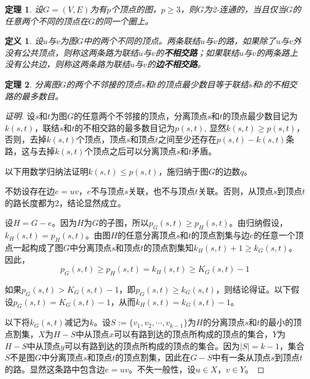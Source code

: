 \documentclass{article}
\newtheorem{Def}{定义}
\newtheorem{Thm}{定理}
\begin{document}
\begin{CJK*}{UTF8}{gbsn}
    \begin{Thm}
    设$G=(V,E)$为有$p$个顶点的图，$p \geq 3$，则$G$为2-连通的，当且仅当$G$的任意两个不同的顶点在$G$的同一个圈上。
  \end{Thm}
  \begin{Def}
    设$u$与$v$为图$G$中的两个不同的顶点。两条联结$u$与$v$的路，如果除了$u$与$v$外没有公共顶点，则称这两条路为联结$u$与$v$的{\bfseries 不相交路}；如果联结$u$与$v$的两条路上没有公共边，则称这两条路为联结$u$与$v$的{\bfseries 边不相交路}。
  \end{Def}
  \begin{Thm}
    分离图$G$的两个不邻接的顶点$s$和$t$的顶点最少数目等于联结$s$和$t$的不相交路的最多数目。
  \end{Thm}
  \begin{proof}[证明]\justifying\let\raggedright\justifying
    设$s$和$t$为图$G$的任意两个不邻接的顶点，分离顶点$s$和$t$的顶点最少数目记为$k(s,t)$，联结$s$和$t$的不相交路的最多数目记为$p(s,t)$,
    显然$k(s,t)\geq p(s,t)$，否则，去掉$k(s,t)$个顶点，顶点$s$和顶点$t$之间至少还存在$p(s,t)-k(s,t)$条路，这与去掉$k(s,t)$个顶点之后可以分离顶点$s$和$t$矛盾。
    
    以下用数学归纳法证明$k(s,t)\leq p(s,t)$，施归纳于图$G$的边数$q$。

    不妨设存在边$e=uv$，$e$不与顶点$s$关联，也不与顶点$t$关联。否则，从顶点$s$到顶点$t$的路长度都为$2$，结论显然成立。

    设$H=G-e$。因为$H$为$G$的子图，所以$p_G(s,t)\geq p_H(s,t)$。由归纳假设，$k_H(s,t) = p_H(s,t)$。由图$H$的任意分离顶点$s$和$t$的顶点割集与边$e$的任意一个顶点一起构成了图$G$中分离顶点$s$和顶点$t$的顶点割集知$k_H(s,t) + 1 \geq k_G(s,t)$。因此，
    \[p_G(s,t)\geq p_H(s,t) = k_H(s,t) \geq K_G(s,t) - 1\]

    如果$p_G(s,t) > K_G(s,t) - 1$，即$p_G(s,t) \geq k_G(s,t)$，则结论得证。以下假设$p_G(s,t) = K_G(s,t) - 1$，从而$k_H(s,t) = k_G(s,t) - 1$。

   以下将$k_{G}(s,t)$减记为$k$。设$S:=\{v_1,v_2,\cdots, v_{k-1}\}$为$H$的分离顶点$s$和$t$的最小的顶点割集，$X$为$H-S$中从顶点$x$可以有路到达的顶点所构成的顶点的集合，$Y$为$H-S$中从顶点$y$可以有路到达的顶点所构成的顶点的集合。因为$|S|=k - 1$，集合$S$不是图$G$中分离顶点$s$和顶点$t$的顶点割集，因此在$G-S$中有一条从顶点$s$到顶点$t$的路。显然这条路中包含边$e=uv$。不失一般性，设$u\in X$，$v\in Y$。


\end{proof}
\end{CJK*}
\end{document}
